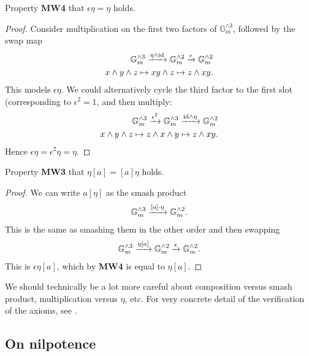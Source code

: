 \documentclass[11pt,openany]{book}
\let\smashprod\wedge
\begin{document}
\begin{proposition} Property \textbf{MW4} that $\epsilon\eta = \eta$ holds.
\end{proposition}
\begin{proof} Consider multiplication on the first two factors of $\mathbb{G}_m^{\smashprod 3}$, followed by the swap map
\begin{align*}
    \mathbb{G}_m^{\smashprod 3} \xto{\eta \smashprod \id} \mathbb{G}_m^{\smashprod 2} \xto{\epsilon} \mathbb{G}_m^{\smashprod 2} \\
    x \smashprod y \smashprod z \mapsto xy\smashprod z \mapsto z \smashprod xy.
\end{align*}
This models $\epsilon\eta$. We could alternatively cycle the third factor to the first slot (corresponding to $\epsilon^2 = 1$, and then multiply:
\begin{align*}
    \mathbb{G}_m^{\smashprod 3} \xto{\epsilon^2} \mathbb{G}_m^{\smashprod 3} \xto{\id \smashprod \eta} \mathbb{G}_m^{\smashprod 2} \\
    x \smashprod y \smashprod z \mapsto z \smashprod x \smashprod y \mapsto z \smashprod xy.
\end{align*}
Hence $\epsilon\eta = \epsilon^2 \eta = \eta$.
\end{proof}


\begin{proposition} Property \textbf{MW3} that $\eta[a] = [a]\eta$ holds.
\end{proposition}
\begin{proof} We can write $a[\eta]$ as the smash product
\begin{align*}
    \mathbb{G}_m^{\smashprod 3} \xto{[a]\cdot \eta} \mathbb{G}_m^{\smashprod 2}.
\end{align*}
This is the same as smashing them in the other order and then swapping
\begin{align*}
    \mathbb{G}_m^{\smashprod 3} \xto{\eta [a]} \mathbb{G}_m^{\smashprod 2} \xto{\epsilon} \mathbb{G}_m^{\smashprod 2}.
\end{align*}
This is $\epsilon\eta[a]$, which by \textbf{MW4} is equal to $\eta[a]$.
\end{proof}

We should technically be a lot more careful about composition versus smash product, multiplication versus $\eta$, etc. For very concrete detail of the verification of the axioms, see \cite[\S3]{Druzhinin}.


\subsection{On nilpotence}
\end{document}
